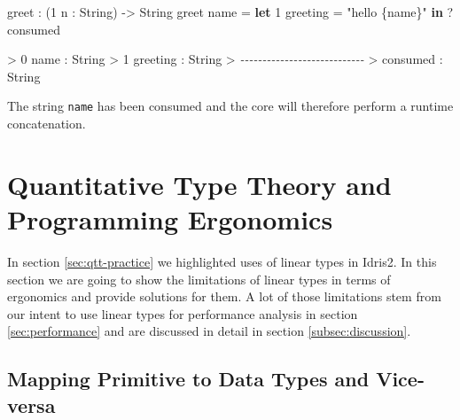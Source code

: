 \documentclass[
]{article}
\newenvironment{Shaded}{}{}
\newcommand{\CommentTok}[1]{\textcolor[rgb]{0.38,0.63,0.69}{\textit{#1}}}
\newcommand{\DataTypeTok}[1]{\textcolor[rgb]{0.56,0.13,0.00}{#1}}
\newcommand{\DecValTok}[1]{\textcolor[rgb]{0.25,0.63,0.44}{#1}}
\newcommand{\KeywordTok}[1]{\textcolor[rgb]{0.00,0.44,0.13}{\textbf{#1}}}
\newcommand{\NormalTok}[1]{#1}
\newcommand{\OperatorTok}[1]{\textcolor[rgb]{0.40,0.40,0.40}{#1}}
\newcommand{\OtherTok}[1]{\textcolor[rgb]{0.00,0.44,0.13}{#1}}
\newcommand{\StringTok}[1]{\textcolor[rgb]{0.25,0.44,0.63}{#1}}
\begin{document}
\begin{Shaded}
\begin{Highlighting}[]
\NormalTok{greet }\OperatorTok{:}\NormalTok{ (}\DecValTok{1}\NormalTok{ n }\OperatorTok{:} \DataTypeTok{String}\NormalTok{) }\OtherTok{{-}\textgreater{}} \DataTypeTok{String}
\NormalTok{greet name }\OtherTok{=} \KeywordTok{let} \DecValTok{1}\NormalTok{ greeting }\OtherTok{=} \StringTok{"hello \{name\}"} \KeywordTok{in} \OperatorTok{?}\NormalTok{consumed}
\end{Highlighting}
\end{Shaded}

\begin{Shaded}
\begin{Highlighting}[]
\OperatorTok{\textgreater{}} \DecValTok{0}\NormalTok{ name }\OperatorTok{:} \DataTypeTok{String}
\OperatorTok{\textgreater{}} \DecValTok{1}\NormalTok{ greeting }\OperatorTok{:} \DataTypeTok{String}
\OperatorTok{\textgreater{}} \CommentTok{{-}{-}{-}{-}{-}{-}{-}{-}{-}{-}{-}{-}{-}{-}{-}{-}{-}{-}{-}{-}{-}{-}{-}{-}{-}{-}{-}{-}}
\OperatorTok{\textgreater{}}\NormalTok{ consumed }\OperatorTok{:} \DataTypeTok{String}
\end{Highlighting}
\end{Shaded}

The string \texttt{name} has been consumed and the core will therefore
perform a runtime concatenation.

\newpage

\hypertarget{quantitative-type-theory-and-programming-ergonomics}{%
\section{Quantitative Type Theory and Programming
Ergonomics}\label{quantitative-type-theory-and-programming-ergonomics}}

\label{sec:qtt-ergonomics}

In section \ref{sec:qtt-practice} we highlighted uses of linear types in
Idris2. In this section we are going to show the limitations of linear
types in terms of ergonomics and provide solutions for them. A lot of
those limitations stem from our intent to use linear types for
performance analysis in section \ref{sec:performance} and are discussed
in detail in section \ref{subsec:discussion}.

\hypertarget{mapping-primitive-to-data-types-and-vice-versa}{%
\subsection{Mapping Primitive to Data Types and
Vice-versa}\label{mapping-primitive-to-data-types-and-vice-versa}}
\end{document}
